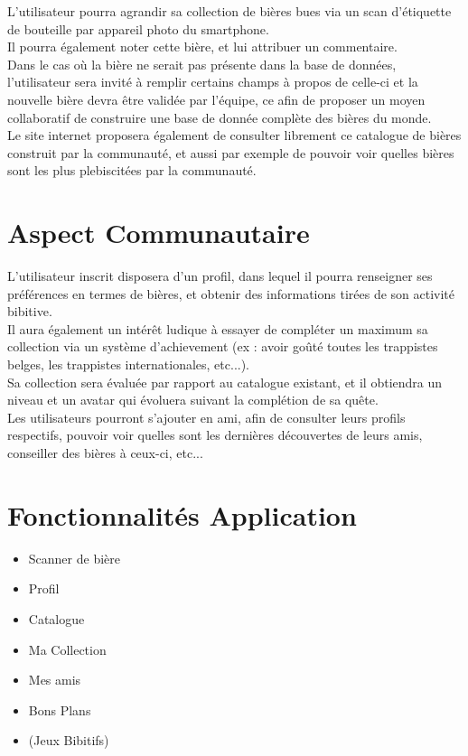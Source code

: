 \documentclass{report}
\begin{document}
		L'utilisateur pourra agrandir sa collection de bières bues via un scan d'étiquette de bouteille par appareil photo du smartphone.\\
		Il pourra également noter cette bière, et lui attribuer un commentaire.\\

		Dans le cas où la bière ne serait pas présente dans la base de données, l'utilisateur sera invité à remplir certains champs à propos de celle-ci et la nouvelle bière devra être validée par l'équipe, ce afin de proposer un moyen collaboratif de construire une base de donnée complète des bières du monde.\\

		Le site internet proposera également de consulter librement ce catalogue de bières construit par la communauté, et aussi par exemple de pouvoir voir quelles bières sont les plus plebiscitées par la communauté.\\

	\section{Aspect Communautaire}

		L'utilisateur inscrit disposera d'un profil, dans lequel il pourra renseigner ses préférences en termes de bières, et obtenir des informations tirées de son activité bibitive.\\

		Il aura également un intérêt ludique à essayer de compléter un maximum sa collection via un système d'achievement (ex : avoir goûté toutes les trappistes belges, les trappistes internationales, etc...).\\
		Sa collection sera évaluée par rapport au catalogue existant, et il obtiendra un niveau et un avatar qui évoluera suivant la complétion de sa quête.\\

		Les utilisateurs pourront s'ajouter en ami, afin de consulter leurs profils respectifs, pouvoir voir quelles sont les dernières découvertes de leurs amis, conseiller des bières à ceux-ci, etc...\\

	\section{Fonctionnalités Application}

		\begin{itemize}
			\item Scanner de bière
			\item Profil
			\item Catalogue
			\item Ma Collection
			\item Mes amis
			\item Bons Plans
			\item (Jeux Bibitifs)
		\end{itemize}
\end{document}

